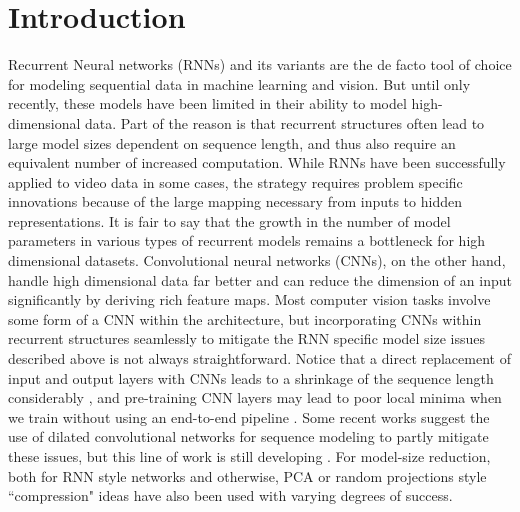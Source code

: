 \section{Introduction}\label{sec:intro}

Recurrent Neural networks (RNNs) and its variants are the de facto 
tool of choice 
for modeling sequential data in machine learning and vision.
But until only recently, these models have been limited in their ability to model high-dimensional data.
Part of the reason is that recurrent structures often lead to large model sizes dependent on sequence length, and thus also require an equivalent number of increased computation.
While RNNs have been successfully applied to video data in some cases, the strategy 
requires problem specific innovations because of the large mapping necessary 
from inputs to hidden representations. It is fair to say that the growth 
in the number of model parameters in various types of 
recurrent models remains a bottleneck for high 
dimensional datasets. 
%
Convolutional neural networks (CNNs), on the other hand, 
handle high dimensional data
far better and 
can reduce the dimension of an input significantly by deriving rich feature maps. Most computer vision tasks involve some form of a CNN within the architecture, but incorporating CNNs within recurrent structures 
seamlessly to mitigate the RNN specific model size issues described above is not always straightforward. Notice that a direct replacement of input and output layers with CNNs leads to a shrinkage of the sequence length considerably \citep{srivastava2015unsupervised}, and pre-training CNN layers may lead to poor local minima when we train without using an end-to-end pipeline \citep{donahue2015long}. Some recent works suggest the use of dilated convolutional networks 
for sequence modeling \citep{yu2015multi} to partly mitigate these issues, but this line of work is still developing \citep{zhenIccv2019}. 
For model-size reduction, both for RNN style networks and otherwise, 
PCA or random projections \citep{ye2005two,bingham2001random} style ``compression" ideas have 
also been used with varying degrees of success.

